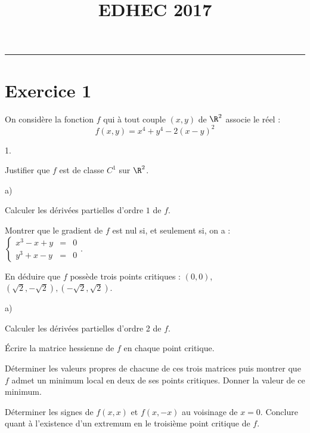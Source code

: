 \documentclass[11pt]{article}%
\title{\bf \vspace{-2cm} EDHEC 2017} %
\author{} %
\date{} %
\begin{document}
\maketitle %
\vspace{-1.4cm}\hrule %
\thispagestyle{fancy}

\vspace*{.2cm}

\section*{Exercice 1}

\noindent
On considère la fonction $f$ qui à tout couple $(x,y)$ de $\R^{2}$
associe le réel :
\[
f(x,y) = x^{4} + y^{4}-2(x-y)^{2}
\]
\begin{noliste}{1.}
  \setlength{\itemsep}{4mm}
\item Justifier que $f$ est de classe $C^{1}$ sur $\R^{2}$.

\item
  \begin{noliste}{a)}
    \setlength{\itemsep}{2mm}
  \item Calculer les dérivées partielles d'ordre $1$ de $f$.
  \item Montrer que le gradient de $f$ est nul si, et seulement si, on
    a : $ \left\{
      \begin{array}{rcl}
        x^{3}-x + y & = & 0 \\
        y^{3} + x-y & = & 0
      \end{array}
    \right.$.
  \item En déduire que $f$ possède trois points critiques : $(0,0)$,
    $(\sqrt{2},-\sqrt{2}), (-\sqrt{2},\sqrt{2})$.
  \end{noliste}

\item
  \begin{noliste}{a)}
    \setlength{\itemsep}{2mm}
  \item Calculer les dérivées partielles d'ordre 2 de $f$.
  \item Écrire la matrice hessienne de $f$ en chaque point critique.
  \item Déterminer les valeurs propres de chacune de ces trois
    matrices puis montrer que $f$ admet un minimum local en deux de
    ses points critiques. Donner la valeur de ce minimum.
  \item Déterminer les signes de $f(x,x)$ et $f(x,-x)$ au voisinage de
    $x = 0$. Conclure quant à l'existence d'un extremum en le troisième
    point critique de $f$.
  \end{noliste}


\end{noliste}
\end{document}
